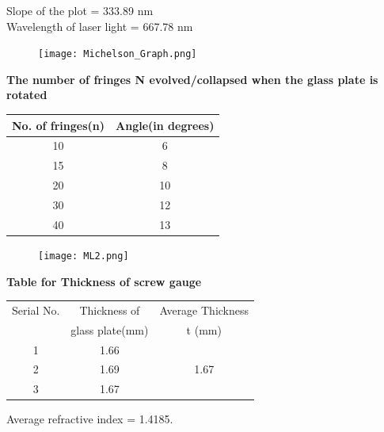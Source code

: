 \documentclass[12pt]{report}
\begin{document}
	Slope of the plot = 333.89 nm \\
	Wavelength of laser light = 667.78 nm
	\newpage
		\begin{figure}[h]
		\centering
		\texttt{[image: Michelson\_Graph.png]}
	\end{figure}
	
	\textbf{The number of fringes N evolved/collapsed when the glass plate is rotated}
	
	\begin{center}
		\begin{tabular}{|c|c|}
			\hline
			No. of fringes(n) & Angle(in degrees) \\ \hline
			10                & 6                 \\
			15                & 8                 \\
			20                & 10                \\
			30                & 12                \\
			40                & 13                \\ \hline
		\end{tabular}
	\end{center}
\newpage
	\begin{figure}[h]
	\centering
	\texttt{[image: ML2.png]}
\end{figure}
	
	\textbf{Table for Thickness of screw gauge}
	\begin{center}
		\begin{tabular}{|c|c|c|}
			\hline
			Serial No. & Thickness of & Average Thickness \\
			& glass plate(mm) & t (mm) \\ \hline
			1 & 1.66 & \\ 
			2 & 1.69 & 1.67 \\
			3 & 1.67 & \\ \hline
		\end{tabular}
	\end{center}
	Average refractive index = 1.4185.
	\newpage
\end{document}
